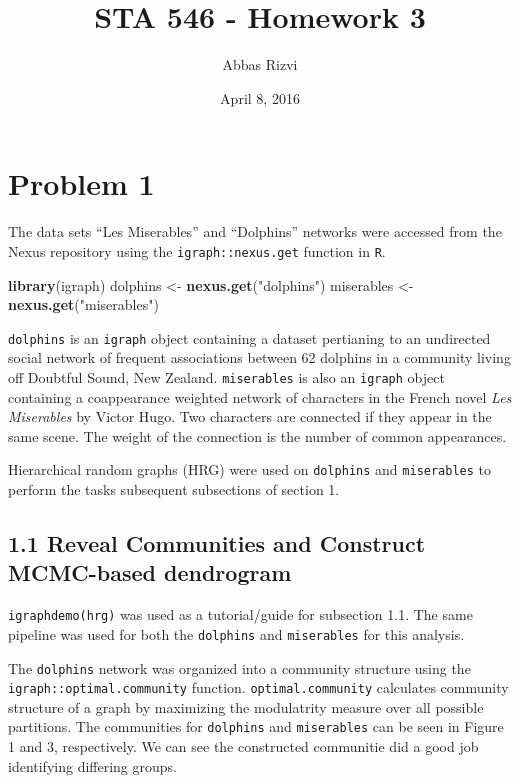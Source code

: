 \documentclass[]{article}
\title{STA 546 - Homework 3}
\author{Abbas Rizvi}
\date{April 8, 2016}
\newenvironment{Shaded}{\begin{snugshade}}{\end{snugshade}}
\newcommand{\KeywordTok}[1]{\textcolor[rgb]{0.13,0.29,0.53}{\textbf{{#1}}}}
\newcommand{\StringTok}[1]{\textcolor[rgb]{0.31,0.60,0.02}{{#1}}}
\newcommand{\NormalTok}[1]{{#1}}
\begin{document}
\maketitle


\section{Problem 1}\label{problem-1}

The data sets ``Les Miserables'' and ``Dolphins'' networks were accessed
from the Nexus repository using the \texttt{igraph::nexus.get} function
in \texttt{R}.

\begin{Shaded}
\begin{Highlighting}[]
\KeywordTok{library}\NormalTok{(igraph)}
\NormalTok{dolphins <-}\StringTok{ }\KeywordTok{nexus.get}\NormalTok{(}\StringTok{"dolphins"}\NormalTok{)}
\NormalTok{miserables <-}\StringTok{ }\KeywordTok{nexus.get}\NormalTok{(}\StringTok{"miserables"}\NormalTok{)}
\end{Highlighting}
\end{Shaded}

\texttt{dolphins} is an \texttt{igraph} object containing a dataset
pertianing to an undirected social network of frequent associations
between 62 dolphins in a community living off Doubtful Sound, New
Zealand. \texttt{miserables} is also an \texttt{igraph} object
containing a coappearance weighted network of characters in the French
novel \emph{Les Miserables} by Victor Hugo. Two characters are connected
if they appear in the same scene. The weight of the connection is the
number of common appearances.

Hierarchical random graphs (HRG) were used on \texttt{dolphins} and
\texttt{miserables} to perform the tasks subsequent subsections of
section 1.

\subsection{1.1 Reveal Communities and Construct MCMC-based
dendrogram}\label{reveal-communities-and-construct-mcmc-based-dendrogram}

\texttt{igraphdemo(\textquotesingle{}hrg\textquotesingle{})} was used as
a tutorial/guide for subsection 1.1. The same pipeline was used for both
the \texttt{dolphins} and \texttt{miserables} for this analysis.

The \texttt{dolphins} network was organized into a community structure
using the \texttt{igraph::optimal.community} function.
\texttt{optimal.community} calculates community structure of a graph by
maximizing the modulatrity measure over all possible partitions. The
communities for \texttt{dolphins} and \texttt{miserables} can be seen in
Figure 1 and 3, respectively. We can see the constructed communitie did
a good job identifying differing groups.
\end{document}
